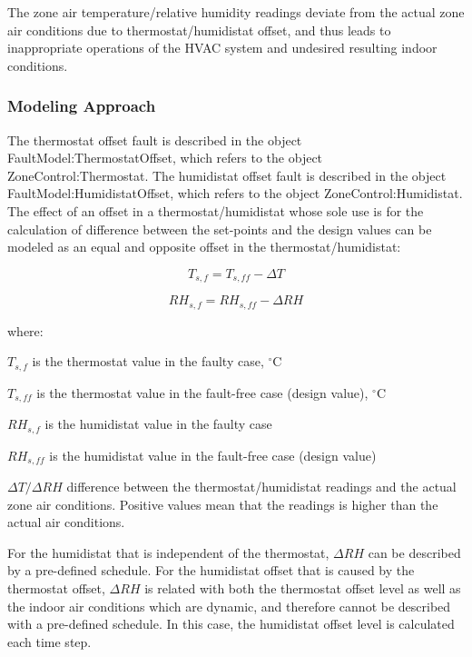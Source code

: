 The zone air temperature/relative humidity readings deviate from the actual zone air conditions due to thermostat/humidistat offset, and thus leads to inappropriate operations of the HVAC system and undesired resulting indoor conditions.

\subsubsection{Modeling Approach}\label{modeling-approach-1}

The thermostat offset fault is described in the object FaultModel:ThermostatOffset, which refers to the object ZoneControl:Thermostat. The humidistat offset fault is described in the object FaultModel:HumidistatOffset, which refers to the object ZoneControl:Humidistat. The effect of an offset in a thermostat/humidistat whose sole use is for the calculation of difference between the set-points and the design values can be modeled as an equal and opposite offset in the thermostat/humidistat:

\begin{equation}
T_{s,f} = T_{s,ff}  - \Delta T
\end{equation}

\begin{equation}
RH_{s,f} = RH_{s,ff}  - \Delta RH
\end{equation}

where:

\(T_{s,f}\) is the thermostat value in the faulty case, \(^{\circ}\)C

\(T_{s,ff}\) is the thermostat value in the fault-free case (design value), \(^{\circ}\)C

\(RH_{s,f}\) is the humidistat value in the faulty case

\(RH_{s,ff}\) is the humidistat value in the fault-free case (design value)

\(\Delta T / \Delta RH\) difference between the thermostat/humidistat readings and the actual zone air conditions. Positive values mean that the readings is higher than the actual air conditions.

For the humidistat that is independent of the thermostat, \(\Delta RH\) can be described by a pre-defined schedule. For the humidistat offset that is caused by the thermostat offset, \(\Delta RH\) is related with both the thermostat offset level as well as the indoor air conditions which are dynamic, and therefore cannot be described with a pre-defined schedule. In this case, the humidistat offset level is calculated each time step.

